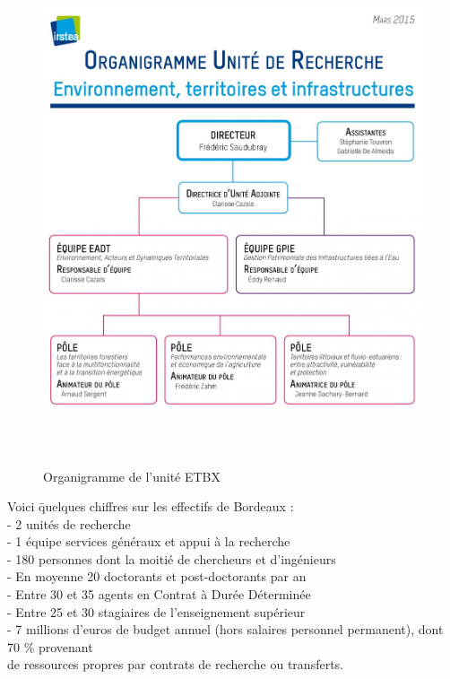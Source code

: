 \documentclass[12pt,a4paper,titlepage,twoside]{report}
\begin{document}
\begin{figure}
\center
\includegraphics[width=12cm,height=15cm,keepaspectratio]{Image/Organigramme_UR_ETBX}%
\caption{Organigramme de l'unité ETBX} 
\end{figure}



\begin{tabbing}
Voici \= quelques chiffres sur les effectifs de Bordeaux : \\
\> - 2 unités de recherche \\
\> - 1 équipe services généraux et appui à la recherche \\
\> - 180 personnes dont la moitié de chercheurs et d'ingénieurs \\
\> - En moyenne 20 doctorants et post-doctorants par an \\
\> - Entre 30 et 35 agents en Contrat à Durée Déterminée \\
\> - Entre 25 et 30 stagiaires de l'enseignement supérieur \\
\> - 7 millions d'euros de budget annuel (hors salaires personnel permanent), dont 70 \% provenant \\ 
\> de ressources propres par contrats de recherche ou transferts. \newline\newline
\end{tabbing}
\end{document}
